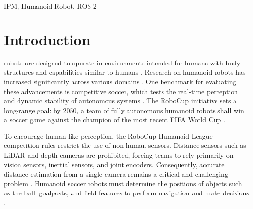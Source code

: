 \documentclass[journal]{IAENGtran}
\begin{document}
\begin{IAENGkeywords}
IPM, Humanoid Robot, ROS 2
\end{IAENGkeywords}






%
\IAENGpeerreviewmaketitle



\section{Introduction} \label{sec:intro}
%
%
%
%
 robots are designed to operate in environments intended
for humans with body structures and capabilities similar to humans \cite{Kajita2014}.
Research on humanoid robots has increased significantly across various domains \cite{Siciliano2010}.
One benchmark for evaluating these advancements is competitive soccer, which tests 
the real-time perception and dynamic stability of autonomous systems \cite{RoboCupHumanoidLeague2025}. 
The RoboCup initiative sets a long-range goal: by 2050, a team of fully autonomous humanoid 
robots shall win a soccer game against the champion of the most recent FIFA World Cup \cite{RobocupFederation2026}.

To encourage human-like perception, the RoboCup Humanoid League competition rules restrict the use of non-human sensors.
Distance sensors such as LiDAR and depth cameras are prohibited, forcing teams to rely primarily on
vision sensors, inertial sensors, and joint encoders. Consequently, accurate distance estimation from a
single camera remains a critical and challenging problem \cite{RoboCupHumanoidLeague2025}. Humanoid soccer robots must determine
the positions of objects such as the ball, goalposts, and field features to perform navigation
and make decisions \cite{SatyaWidodo2012}.
\end{document}
